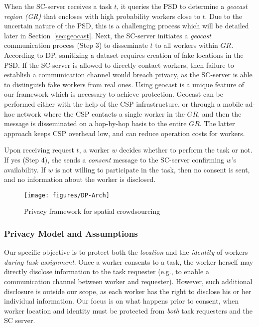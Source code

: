 \documentclass{USC-Thesis}
\numberwithin{equation}{chapter}
\begin{document}
When the SC-server receives a task $t$, it queries the PSD to determine a {\em geocast region (GR)} that encloses with high probability workers close to $t$. Due to the uncertain nature of the PSD, this is a challenging process which will be detailed later in Section~\ref{sec:geocast}. Next, the SC-server initiates a {\em geocast} communication \cite{navas1997geocast} process (Step $3$) to disseminate $t$ to all workers within $\mathit{GR}$. According to DP, sanitizing a dataset requires creation of fake locations in the PSD. If the SC-server is allowed to directly contact workers, then failure to establish a communication channel would breach privacy, as the SC-server is able to distinguish fake workers from real ones. Using geocast is a unique feature of our framework which is necessary to achieve protection. Geocast can be performed either with the help of the CSP infrastructure, or through a mobile ad-hoc network where the CSP contacts a single worker in the $\mathit{GR}$, and then the message is disseminated on a hop-by-hop basis to the entire $\mathit{GR}$. The latter approach keeps CSP overhead low, and can reduce operation costs for workers.  

Upon receiving request $t$, a worker $w$ decides whether to perform the task or not. If yes (Step $4$), she sends a {\em consent} message to the SC-server confirming $w$'s availability.
If $w$ is not willing to participate in the task, then no consent is sent, and no information about the worker is disclosed.

\begin{figure}[!htb]\centering
  \texttt{[image: figures/DP-Arch]}
  \caption{Privacy framework for spatial crowdsourcing}
  \label{fig:framework}
\end{figure}

\subsubsection{Privacy Model and Assumptions}
\label{sec:privacy}
Our specific objective is to protect both the {\em location} and the {\em identity} of workers {\em during task assignment}. Once a worker consents to a task, the worker herself may directly disclose information to the task requester (e.g., to enable a communication channel between worker and requester). However, such additional disclosure is outside our scope, as each worker has the right to disclose his or her individual information. Our focus is on what happens prior to consent, when worker location and identity must be protected from {\em both} task requesters and the SC server. 
\end{document}
